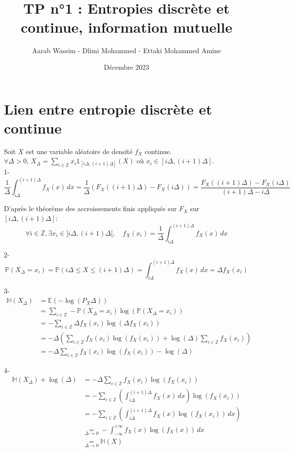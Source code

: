 \documentclass[a4paper]{article}
\title{TP n°1 : Entropies discrète et continue, information mutuelle}
\author{Aarab Wassim - Dlimi Mohammed - Ettaki Mohammed Amine}
\date{Décembre 2023}
\begin{document}
\maketitle
\tableofcontents
\newpage
\section{Lien entre entropie discrète et continue}


Soit $X$ est une variable aléatoire de densité $f_{X}$ continue.\\
$\forall \Delta > 0$, $X_{\Delta} = \sum_{i\in \mathbb{Z}} x_{i}\mathbb{1}_{[i\Delta,(i+1)\Delta]}(X)$ où $x_i \in [i\Delta,(i+1)\Delta]$.\\

1- 
\[
\frac{1}{\Delta} \int_{i\Delta}^{(i+1)\Delta} f_X(x) \, dx = \frac{1}{\Delta} (F_X((i+1)\Delta) - F_X(i\Delta)) = \frac{F_X((i+1)\Delta) - F_X(i\Delta)}{(i+1)\Delta - i\Delta}
\]

D'après le théorème des accroissements finis appliqués sur $F_X$ sur $[i\Delta,(i+1)\Delta]$: \\
\[
\forall i \in \mathbb{Z}, \exists x_i \in ]i\Delta,(i+1)\Delta[, \quad f_X(x_i) = \frac{1}{\Delta} \int_{i\Delta}^{(i+1)\Delta} f_X(x) \,dx
\]

2-
\[
\mathbb{P}(X_\Delta = x_i) = \mathbb{P}(i\Delta \leq X \leq (i+1)\Delta) = \int_{i\Delta}^{(i+1)\Delta} f_X(x) \, dx = \Delta f_X(x_i) 
\]

3- 
\begin{align*}
    \mathbb{H}(X_\Delta) & = \mathbb{E}(-\log(P_X\Delta)) \\
    & = \sum_{i\in \mathbb{Z}} -\mathbb{P}(X_\Delta=x_i)\log(\mathbb{P}(X_\Delta = x_i)) \\
    & = - \sum_{i\in \mathbb{Z}} \Delta f_X(x_i)\log(\Delta f_X(x_i)) \\
    & = - \Delta\left(\sum_{i\in \mathbb{Z}} f_X(x_i)\log(f_X(x_i)) + \log(\Delta) \sum_{i\in \mathbb{Z}} f_X(x_i)\right) \\
    & = - \Delta\sum_{i\in \mathbb{Z}} f_X(x_i)\log(f_X(x_i)) - \log(\Delta)
\end{align*}

4- 
\begin{align*}
    \mathbb{H}(X_\Delta) + \log(\Delta) & = - \Delta\sum_{i\in \mathbb{Z}} f_X(x_i)\log(f_X(x_i)) \\
    & = - \sum_{i\in \mathbb{Z}} \left(\int_{i\Delta}^{(i+1)\Delta} f_X(x) \, dx\right) \log(f_X(x_i)) \\
    & = - \sum_{i\in \mathbb{Z}} \left(\int_{i\Delta}^{(i+1)\Delta} f_X(x)\log(f_X(x_i)) \, dx\right) \\
    & \underset{\Delta \rightarrow 0}{=} - \int_{-\infty}^{+\infty} f_X(x)\log(f_X(x)) \, dx\\
    & \underset{\Delta \rightarrow 0}{=} \mathbb{H}(X)\\
\end{align*}
\end{document}
